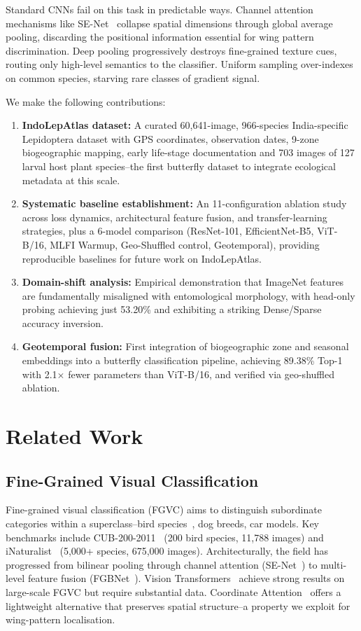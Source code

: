 \documentclass[11pt]{article}
\begin{document}
Standard CNNs fail on this task in predictable ways. Channel attention mechanisms like SE-Net~\cite{hu2018squeeze} collapse spatial dimensions through global average pooling, discarding the positional information essential for wing pattern discrimination. Deep pooling progressively destroys fine-grained texture cues, routing only high-level semantics to the classifier. Uniform sampling over-indexes on common species, starving rare classes of gradient signal.

We make the following contributions:
\begin{enumerate}[label=(\arabic*)]
    \item \textbf{IndoLepAtlas dataset:} A curated 60,641-image, 966-species India-specific Lepidoptera dataset with GPS coordinates, observation dates, 9-zone biogeographic mapping, early life-stage documentation and 703 images of 127 larval host plant species--the first butterfly dataset to integrate ecological metadata at this scale.
    \item \textbf{Systematic baseline establishment:} An 11-configuration ablation study across loss dynamics, architectural feature fusion, and transfer-learning strategies, plus a 6-model comparison (ResNet-101, EfficientNet-B5, ViT-B/16, MLFI Warmup, Geo-Shuffled control, Geotemporal), providing reproducible baselines for future work on IndoLepAtlas.
    \item \textbf{Domain-shift analysis:} Empirical demonstration that ImageNet features are fundamentally misaligned with entomological morphology, with head-only probing achieving just 53.20\% and exhibiting a striking Dense/Sparse accuracy inversion.
    \item \textbf{Geotemporal fusion:} First integration of biogeographic zone and seasonal embeddings into a butterfly classification pipeline, achieving 89.38\% Top-1 with 2.1$\times$ fewer parameters than ViT-B/16, and verified via geo-shuffled ablation.
\end{enumerate}

\section{Related Work}

\subsection{Fine-Grained Visual Classification}
Fine-grained visual classification (FGVC) aims to distinguish subordinate categories within a superclass--bird species~\cite{wah2011cub}, dog breeds, car models. Key benchmarks include CUB-200-2011~\cite{wah2011cub} (200 bird species, 11,788 images) and iNaturalist~\cite{vanhorn2018inaturalist} (5,000+ species, 675,000 images). Architecturally, the field has progressed from bilinear pooling through channel attention (SE-Net~\cite{hu2018squeeze}) to multi-level feature fusion (FGBNet~\cite{yuan2025fgbnet}). Vision Transformers~\cite{dosovitski2021image} achieve strong results on large-scale FGVC but require substantial data. Coordinate Attention~\cite{hou2021coordinate} offers a lightweight alternative that preserves spatial structure--a property we exploit for wing-pattern localisation.
\end{document}
